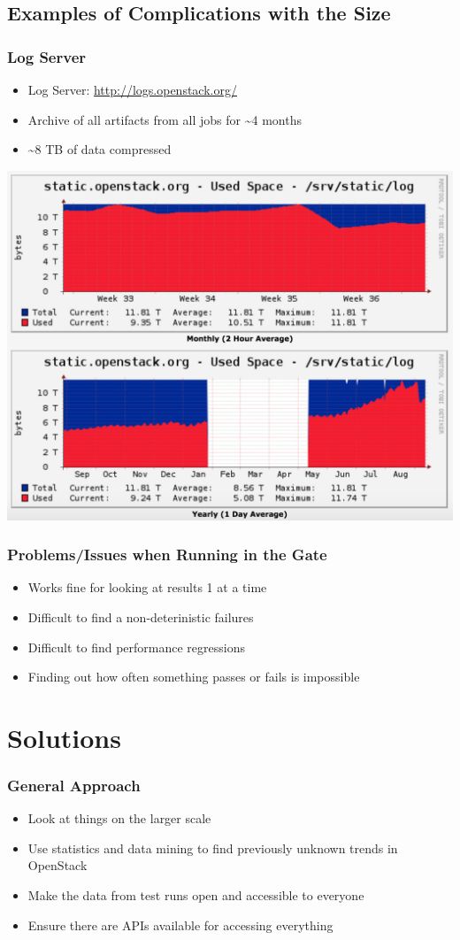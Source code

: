 \documentclass[aspectratio=43,11pt,hyperref={colorlinks=true}]{beamer}
\begin{document}
\subsection{Examples of Complications with the Size}
\begin{frame}
  \frametitle{Log Server}
  \begin{itemize}
    \item Log Server: \href{http://logs.openstack.org/}{http://logs.openstack.org/}
    \item Archive of all artifacts from all jobs for \textasciitilde4 months
    \item \textasciitilde8 TB of data compressed
  \end{itemize}
  \begin{center}
    \includegraphics[width=.55\textwidth]{cacti-static-openstack-org-log-graph.png}
  \end{center}
\end{frame}

\begin{frame}
  \frametitle{Problems/Issues when Running in the Gate}
  \begin{itemize}
    \item Works fine for looking at results 1 at a time
    \item Difficult to find a non-deterinistic failures
    \item Difficult to find performance regressions
    \item Finding out how often something passes or fails is impossible
  \end{itemize}
\end{frame}

\section{Solutions}
\begin{frame}
  \frametitle{General Approach}
    \begin{itemize}
        \item Look at things on the larger scale
        \item Use statistics and data mining to find previously unknown trends
            in OpenStack
        \item Make the data from test runs open and accessible to everyone
        \item Ensure there are APIs available for accessing everything
    \end{itemize}
\end{frame}
\end{document}
